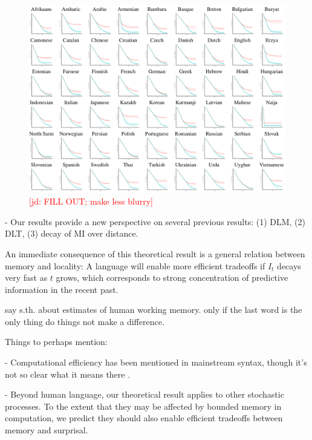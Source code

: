 \documentclass[12pt]{article}
\newcommand{\jd}[1]{\textcolor{Red}{[jd: #1]}}
\begin{document}
\begin{figure}
\includegraphics[width=\textwidth]{figures/full-results.png}
	\caption{\jd{FILL OUT; make less blurry}}\label{fig:results}
\end{figure}




- Our results provide a new perspective on several previous results: (1) DLM, (2) DLT, (3) decay of MI over distance.

An immediate consequence of this theoretical result is a general relation between memory and locality:
A language will enable more efficient tradeoffs if $I_t$ decays very fast as $t$ grows, which corresponds to strong concentration of predictive information in the recent past.



say s.th. about estimates of human working memory. only if the last word is the only thing do things not make a difference.


Things to perhaps mention:


- Computational efficiency has been mentioned in mainstream syntax, though it's not so clear what it means there \cite{chomsky2005three,hauser2002faculty}.

- Beyond human language, our theoretical result applies to other stochastic processes. To the extent that they may be affected by bounded memory in computation, we predict they should also enable efficient tradeoffs between memory and surprisal.
\end{document}
